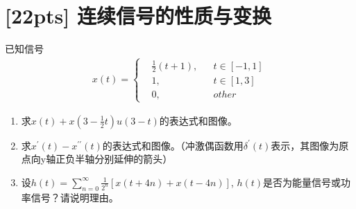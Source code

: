 \documentclass[a4paper,UTF8]{article}
\numberwithin{equation}{section}
\begin{document}
\section{[22pts] 连续信号的性质与变换}
已知信号
\begin{equation*}
    \begin{aligned}
    x(t)=\left\{
    \begin{aligned}
    & \frac{1}{2}(t+1), && t\in[-1,1]\\
    & 1, && t\in[1,3]\\
    & 0, && other
    \end{aligned}
    \right.
    \end{aligned}
\end{equation*}
\begin{enumerate}[(1)]
	\item 求$x(t)+x(3-\displaystyle\frac{1}{2}t)u(3-t)$的表达式和图像。
	\item 求$x^{\prime}(t)-x^{\prime\prime}(t)$的表达式和图像。（冲激偶函数用$\delta^{\prime}(t)$表示，其图像为原点向y轴正负半轴分别延伸的箭头）
	\item 设$h(t)=\displaystyle\sum^{\infty}_{n=0}\frac{1}{2^n}\left[x(t+4n)+x(t-4n)\right]$, $h(t)$是否为能量信号或功率信号？请说明理由。
\end{enumerate}
	
\end{document}
